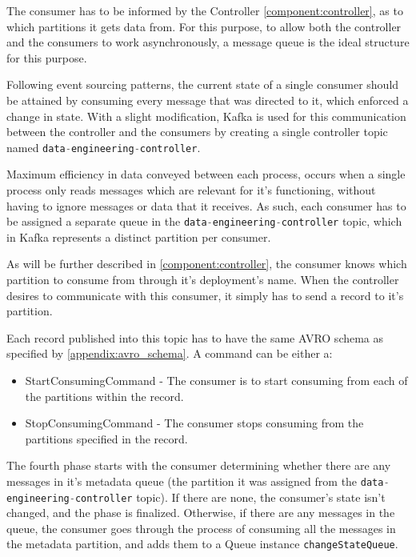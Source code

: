 The consumer has to be informed by the Controller \ref{component:controller}, as to which partitions it gets data from. For this purpose, to allow both the controller and the consumers to work asynchronously, a message queue is the ideal structure for this purpose.

Following event sourcing patterns, the current state of a single consumer should be attained by consuming every message that was directed to it, which enforced a change in state. With a slight modification, Kafka is used for this communication between the controller and the consumers by creating a single controller topic named \lstinline[language=Python]{data-engineering-controller}.

Maximum efficiency in data conveyed between each process, occurs when a single process only reads messages which are relevant for it's functioning, without having to ignore messages or data that it receives. As such, each consumer has to be assigned a separate queue in the \lstinline[language=Python]{data-engineering-controller} topic, which in Kafka represents a distinct partition per consumer.

As will be further described in \ref{component:controller}, the consumer knows which partition to consume from through it's deployment's name. When the controller desires to communicate with this consumer, it simply has to send a record to it's partition. 

Each record published into this topic has to have the same AVRO schema as specified by \ref{appendix:avro_schema}. A command can be either a: 
\begin{itemize}
    \item StartConsumingCommand - The consumer is to start consuming from each of the partitions within the record.
    \item StopConsumingCommand - The consumer stops consuming from the partitions specified in the record.
\end{itemize}

The fourth phase starts with the consumer determining whether there are any messages in it's metadata queue (the partition it was assigned from the \lstinline[language=Python]{data-engineering-controller} topic). If there are none, the consumer's state isn't changed, and the phase is finalized. Otherwise, if there are any messages in the queue, the consumer goes through the process of consuming all the messages in the metadata partition, and adds them to a Queue instance \lstinline[language=Python]{changeStateQueue}.

